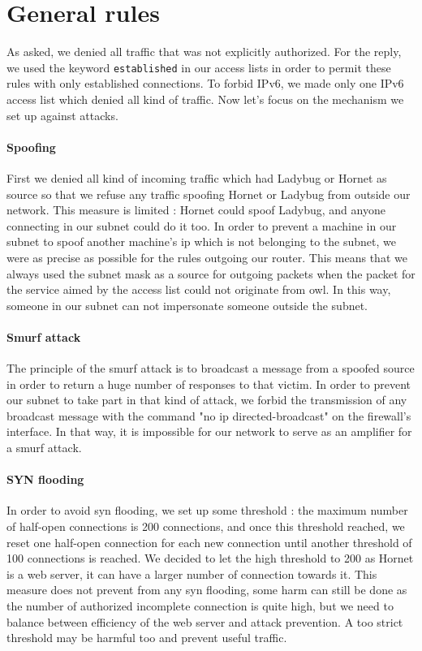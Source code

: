 \documentclass[a4paper,titlepage]{article}
\begin{document}
\section{General rules}
As asked, we denied all traffic that was not explicitly authorized. For the reply, we used the keyword \texttt{established} in our access lists in order to permit these rules with only established connections. To forbid IPv6, we made only one IPv6 access list which denied all kind of traffic. Now let's focus on the mechanism we set up against attacks.

\paragraph{Spoofing}
First we denied all kind of incoming traffic which had Ladybug or Hornet as source so that we refuse any traffic spoofing Hornet or Ladybug from outside our network. This measure is limited : Hornet could spoof Ladybug, and anyone connecting in our subnet could do it too. In order to  prevent a machine in our subnet to spoof another machine's ip which is not belonging to the subnet, we were as precise as possible for the rules outgoing our router. This means that we always used the subnet mask as a source for outgoing packets when the packet for the service aimed by the access list could not originate from owl.  In this way, someone in our subnet can not impersonate someone outside the subnet.

\paragraph{Smurf attack}
The principle of the smurf attack is to broadcast a message from a spoofed source in order to return a huge number of responses to that victim.
In order to prevent our subnet to take part in that kind of attack, we forbid the transmission of any broadcast message with the command "no ip directed-broadcast" on the firewall's interface. In that way, it is impossible for our network to serve as an amplifier for a smurf attack.

\paragraph{SYN flooding}
In order to avoid syn flooding, we set up some threshold : the maximum number of half-open connections is 200 connections, and once this threshold reached, we reset one half-open connection for each new connection until another threshold of 100 connections is reached. We decided to let the high threshold to 200 as Hornet is a web server, it can have a larger number of connection towards it. This measure does not prevent from any syn flooding, some harm can still be done as the number of authorized incomplete connection is quite high, but we need to balance between efficiency of the web server and attack prevention. A too strict threshold may be harmful too and prevent useful traffic.
\end{document}

